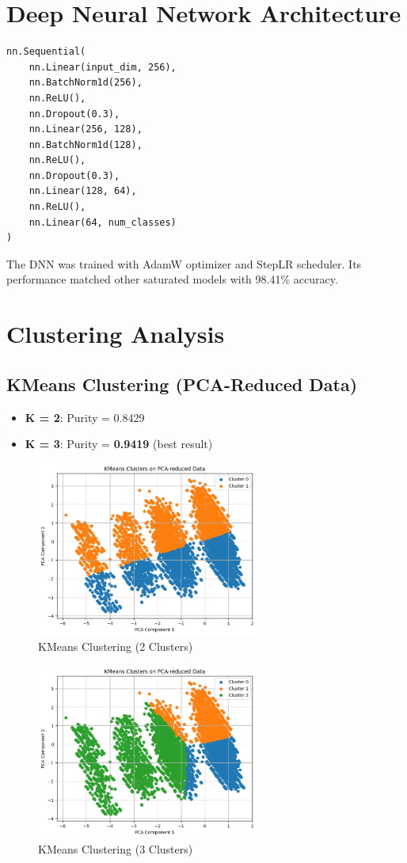 \documentclass{article}
\begin{document}
\section{Deep Neural Network Architecture}
\begin{verbatim}
nn.Sequential(
    nn.Linear(input_dim, 256),
    nn.BatchNorm1d(256),
    nn.ReLU(),
    nn.Dropout(0.3),
    nn.Linear(256, 128),
    nn.BatchNorm1d(128),
    nn.ReLU(),
    nn.Dropout(0.3),
    nn.Linear(128, 64),
    nn.ReLU(),
    nn.Linear(64, num_classes)
)
\end{verbatim}
The DNN was trained with AdamW optimizer and StepLR scheduler. Its performance matched other saturated models with 98.41\% accuracy.

\section{Clustering Analysis}

\subsection*{KMeans Clustering (PCA-Reduced Data)}
\begin{itemize}
    \item \textbf{K = 2}: Purity = 0.8429
    \item \textbf{K = 3}: Purity = \textbf{0.9419} (best result)
\end{itemize}

\begin{figure}[H]
\centering
\includegraphics[width=0.65\textwidth]{KMeans_clustering_2.png}
\caption{KMeans Clustering (2 Clusters)}
\end{figure}

\begin{figure}[H]
\centering
\includegraphics[width=0.65\textwidth]{KMeans_clustering_3.png}
\caption{KMeans Clustering (3 Clusters)}
\end{figure}
\end{document}

